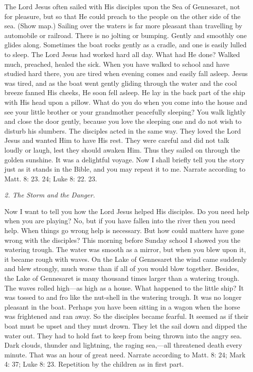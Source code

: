 The Lord Jesus often sailed with His disciples upon the Sea of Gennesaret, not for pleasure, but so that He could preach to the people on the other side of the sea. (Show map.) Sailing over the waters is far more pleasant than travelling by automobile or railroad. There is no jolting or bumping. Gently and smoothly one glides along. Sometimes the boat rocks gently as a cradle, and one is easily lulled to sleep. The Lord Jesus had worked hard all day. What had He done? Walked much, preached, healed the sick. When you have walked to school and have studied hard there, you are tired when evening comes and easily fall asleep. Jesus was tired, and as the boat went gently gliding through the water and the cool breeze fanned His cheeks, He soon fell asleep. He lay in the back part of the ship with His head upon a pillow. What do you do when you come into the house and see your little brother or your grandmother peacefully sleeping? You walk lightly and close the door
gently, because you love the sleeping one and do not wish to disturb his slumbers. The disciples acted in the same way. They loved the Lord Jesus and wanted Him to have His rest. They were careful and did not talk loudly or laugh, lest they should awaken Him. Thus they sailed on through the golden sunshine. It was a delightful voyage. Now I shall briefly tell you the story just as it stands in the Bible, and you may repeat it to me. Narrate according to Matt. 8: 23. 24; Luke 8: 22. 23.

\emph{2. The Storm and the Danger.}

Now I want to tell you how the Lord Jesus helped His disciples. Do you need help when you are playing? No, but if you have fallen into the river then you need help. When things go wrong help is necessary. But how could matters have gone wrong with the disciples? This morning before Sunday school I showed you the watering trough. The water was smooth as a mirror, but when you blew upon it, it became rough with waves. On the Lake of Gennesaret the wind came suddenly and blew strongly, much worse than if all of you would blow together. Besides, the Lake of Gennesaret is many thousand times larger than a watering trough. The waves rolled high—as high as a house. What happened to the little ship? It was tossed to and fro like the nut-shell in the watering trough. It was no longer pleasant in the boat. Perhaps you have been sitting in a wagon when the horse was frightened and ran away. So the disciples became fearful. It seemed as if their boat must be upset and they must drown. They let the sail down and dipped the water out. They had to hold fast to keep from being thrown into the angry sea. Dark clouds, thunder and lightning, the raging sea,—all threatened death every minute. That was an hour of great need. Narrate according to Matt. 8: 24; Mark 4: 37; Luke 8: 23. Repetition by the children as in first part.

